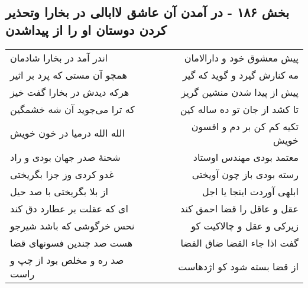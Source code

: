 \begin{center}
\section*{بخش ۱۸۶ - در آمدن آن عاشق لاابالی در بخارا وتحذیر کردن دوستان او را از پیداشدن}
\label{sec:sh186}
\begin{longtable}{l p{0.5cm} r}
اندر آمد در بخارا شادمان
&&
پیش معشوق خود و دارالامان
\\
همچو آن مستی که پرد بر اثیر
&&
مه کنارش گیرد و گوید که گیر
\\
هرکه دیدش در بخارا گفت خیز
&&
پیش از پیدا شدن منشین گریز
\\
که ترا می‌جوید آن شه خشمگین
&&
تا کشد از جان تو ده ساله کین
\\
الله الله درمیا در خون خویش
&&
تکیه کم کن بر دم و افسون خویش
\\
شحنهٔ صدر جهان بودی و راد
&&
معتمد بودی مهندس اوستاد
\\
غدو کردی وز جزا بگریختی
&&
رسته بودی باز چون آویختی
\\
از بلا بگریختی با صد حیل
&&
ابلهی آوردت اینجا یا اجل
\\
ای که عقلت بر عطارد دق کند
&&
عقل و عاقل را قضا احمق کند
\\
نحس خرگوشی که باشد شیرجو
&&
زیرکی و عقل و چالاکیت کو
\\
هست صد چندین فسونهای قضا
&&
گفت اذا جاء القضا ضاق الفضا
\\
صد ره و مخلص بود از چپ و راست
&&
از قضا بسته شود کو اژدهاست
\\
\end{longtable}
\end{center}
